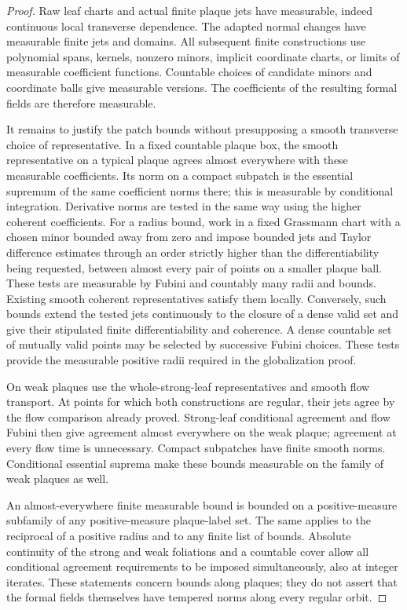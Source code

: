 \begin{proof}
Raw leaf charts and actual finite plaque jets have measurable,
indeed continuous local transverse dependence. The adapted
normal changes have measurable finite jets and domains. All
subsequent finite constructions use polynomial spans, kernels,
nonzero minors, implicit coordinate charts, or limits of measurable
coefficient functions. Countable choices of candidate minors and
coordinate balls give measurable versions. The coefficients of
the resulting formal fields are therefore measurable.

It remains to justify the patch bounds without presupposing a
smooth transverse choice of representative. In a fixed countable
plaque box, the smooth representative on a typical plaque agrees
almost everywhere with these measurable coefficients. Its norm
on a compact subpatch is the essential supremum of the same
coefficient norms there; this is measurable by conditional
integration. Derivative norms are tested in the same way using
the higher coherent coefficients. For a radius bound, work in
a fixed Grassmann chart with a chosen minor bounded away from
zero and impose bounded jets and Taylor difference estimates
through an order strictly higher than the differentiability being
requested, between almost every pair of points on a smaller
plaque ball. These tests are measurable by Fubini and countably
many radii and bounds. Existing smooth coherent representatives
satisfy them locally. Conversely, such bounds extend the tested
jets continuously to the closure of a dense valid set and give
their stipulated finite differentiability and coherence. A dense
countable set of mutually valid points may be selected by
successive Fubini choices. These tests provide the measurable
positive radii required in the globalization proof.

On weak plaques use the whole-strong-leaf representatives and
smooth flow transport. At points for which both constructions
are regular, their jets agree by the flow comparison already
proved. Strong-leaf conditional agreement and flow Fubini then
give agreement almost everywhere on the weak plaque; agreement
at every flow time is unnecessary. Compact subpatches have
finite smooth norms. Conditional essential suprema make these
bounds measurable on the family of weak plaques as well.

An almost-everywhere finite measurable bound is bounded on a
positive-measure subfamily of any positive-measure plaque-label
set. The same applies to the reciprocal of a positive radius
and to any finite list of bounds. Absolute continuity of the
strong and weak foliations and a countable cover allow all
conditional agreement requirements to be imposed simultaneously,
also at integer iterates. These statements concern bounds along
plaques; they do not assert that the formal fields themselves
have tempered norms along every regular orbit.
\end{proof}

